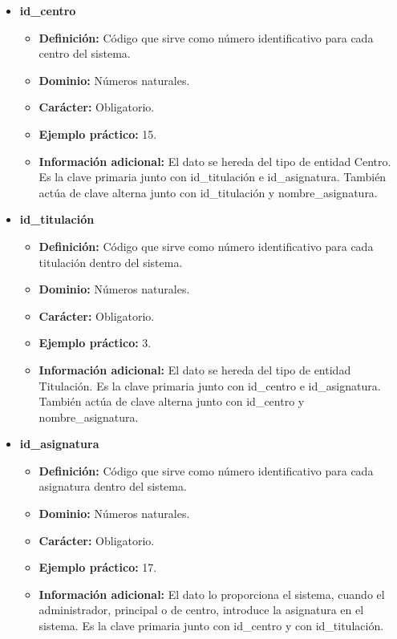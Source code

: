 \begin{description}
   \begin{itemize}
   \item \textbf{id\_centro}
      \begin{itemize}
         \item \textbf{Definición:} Código que sirve como número identificativo
               para cada centro del sistema.
         \item \textbf{Dominio:} Números naturales.
         \item \textbf{Carácter:} Obligatorio.
         \item \textbf{Ejemplo práctico:} 15.
         \item \textbf{Información adicional:} El dato se hereda del tipo de
         entidad Centro. Es la clave primaria junto con id\_titulación e
         id\_asignatura. También actúa de clave alterna junto con
         id\_titulación y nombre\_asignatura.
      \end{itemize}
   \item \textbf{id\_titulación}
      \begin{itemize}
         \item \textbf{Definición:} Código que sirve como número identificativo
         para cada titulación dentro del sistema.
         \item \textbf{Dominio:} Números naturales.
         \item \textbf{Carácter:} Obligatorio.
         \item \textbf{Ejemplo práctico:} 3.
         \item \textbf{Información adicional:} El dato se hereda del tipo de
         entidad Titulación. Es la clave primaria junto con id\_centro e
         id\_asignatura. También actúa de clave alterna junto con
         id\_centro y nombre\_asignatura.
      \end{itemize}
   \item \textbf{id\_asignatura}
      \begin{itemize}
         \item \textbf{Definición:} Código que sirve como número identificativo
         para cada asignatura dentro del sistema.
         \item \textbf{Dominio:} Números naturales.
         \item \textbf{Carácter:} Obligatorio.
         \item \textbf{Ejemplo práctico:} 17.
         \item \textbf{Información adicional:} El dato lo proporciona el sistema, cuando el administrador, principal o de centro, introduce la asignatura en el sistema. Es la clave primaria junto con id\_centro y con id\_titulación.

\end{itemize}
\end{itemize}
\end{description}
